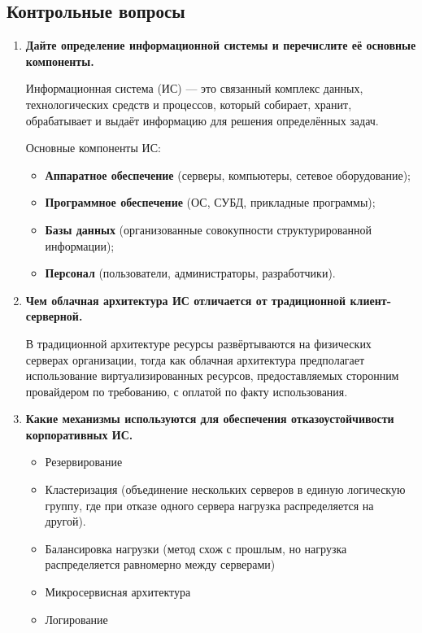 \documentclass[a4paper, 14pt]{extarticle}
\begin{document}
\subsection{Контрольные вопросы}
\begin{enumerate}[label=\textbf{\arabic*.}, itemsep=1.5em, leftmargin=*]
  \item \textbf{Дайте определение информационной системы и
    перечислите её основные компоненты.}

    Информационная система (ИС) --- это связанный комплекс данных,
    технологических средств и процессов, который собирает, хранит,
    обрабатывает и выдаёт информацию для решения определённых задач.

    Основные компоненты ИС:
    \begin{itemize}[label={---}, leftmargin=1.5em, itemsep=0.5em]
      \item \textbf{Аппаратное обеспечение} (серверы, компьютеры,
        сетевое оборудование);
      \item \textbf{Программное обеспечение} (ОС, СУБД, прикладные программы);
      \item \textbf{Базы данных} (организованные совокупности
        структурированной информации);
      \item \textbf{Персонал} (пользователи, администраторы, разработчики).
    \end{itemize}

  \item \textbf{Чем облачная архитектура ИС отличается от
    традиционной клиент-серверной.}

    В традиционной архитектуре ресурсы развёртываются на физических
    серверах организации, тогда как облачная архитектура предполагает
    использование виртуализированных ресурсов, предоставляемых
    сторонним провайдером по требованию, с оплатой по факту использования.
  \item \textbf{Какие механизмы используются для обеспечения
    отказоустойчивости корпоративных ИС.}

    \begin{itemize}
      \item Резервирование
      \item Кластеризация (объединение нескольких серверов в единую
          логическую группу, где при отказе одного сервера нагрузка
        распределяется на другой).
      \item Балансировка нагрузки (метод схож с прошлым, но нагрузка
        распределяется равномерно между серверами)
      \item Микросервисная архитектура
      \item Логирование
    \end{itemize}


\end{enumerate}
\end{document}
